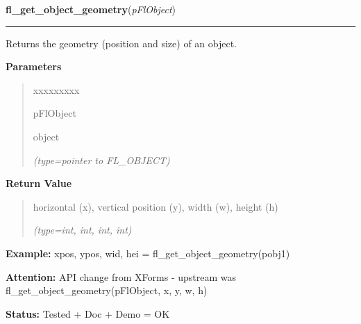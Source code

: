     \vspace{0.5ex}

\hspace{.8\funcindent}\begin{boxedminipage}{\funcwidth}

    \raggedright \textbf{fl\_get\_object\_geometry}(\textit{pFlObject})

    \vspace{-1.5ex}

    \rule{\textwidth}{0.5\fboxrule}
\setlength{\parskip}{2ex}
    Returns the geometry (position and size) of an object.

\setlength{\parskip}{1ex}
      \textbf{Parameters}
      \vspace{-1ex}

      \begin{quote}
        \begin{Ventry}{xxxxxxxxx}

          \item[pFlObject]

          object

            {\it (type=pointer to FL\_OBJECT)}

        \end{Ventry}

      \end{quote}

      \textbf{Return Value}
    \vspace{-1ex}

      \begin{quote}
      horizontal (x), vertical position (y), width (w), height (h)

      {\it (type=int, int, int, int)}

      \end{quote}

\textbf{Example:} xpos, ypos, wid, hei = fl\_get\_object\_geometry(pobj1)



\textbf{Attention:} API change from XForms - upstream was fl\_get\_object\_geometry(pFlObject, 
x, y, w, h)



\textbf{Status:} Tested + Doc + Demo = OK



    \end{boxedminipage}

    \label{xformslib:flbasic:fl_get_object_position}

